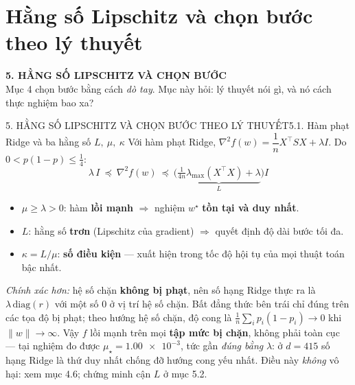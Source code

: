 \documentclass[aspectratio=169,11pt]{beamer}
\newcommand{\wstar}{w^{\star}}
\newcommand{\norm}[1]{\lVert #1 \rVert}
\begin{document}
\section{Hằng số Lipschitz và chọn bước theo lý thuyết}

\begin{frame}[plain]
  \label{sec:5}%
  \begin{center}{\Large\color{accent}\textbf{5. HẰNG SỐ LIPSCHITZ VÀ CHỌN BƯỚC}}\\[4pt]
  {\small Mục 4 chọn bước bằng cách \emph{dò tay}. Mục này hỏi: lý thuyết nói gì,
  và nó cách thực nghiệm bao xa?}\end{center}
\end{frame}

\begin{frame}{5. HẰNG SỐ LIPSCHITZ VÀ CHỌN BƯỚC THEO LÝ THUYẾT}{5.1. Hàm phạt Ridge và ba hằng số $L,\ \mu,\ \kappa$}
  \small
  Với hàm phạt Ridge, $\nabla^2 f(w)=\dfrac1n X^\top S X+\lambda I$. Do $0<p(1-p)\le\frac14$:
  \[
    \lambda\,I\ \preceq\ \nabla^2 f(w)\ \preceq\ \Big(\underbrace{\tfrac{1}{4n}\lambda_{\max}(X^\top X)+\lambda}_{L}\Big) I
  \]
  \begin{itemize}
    \item $\mu\ge\lambda>0$: hàm \textbf{lồi mạnh} $\Rightarrow$ nghiệm $\wstar$ \textbf{tồn tại và duy nhất}.
    \item $L$: hằng số \textbf{trơn} (Lipschitz của gradient) $\Rightarrow$ quyết định độ dài bước tối đa.
    \item $\kappa=L/\mu$: \textbf{số điều kiện} — xuất hiện trong tốc độ hội tụ của mọi thuật toán bậc nhất.
  \end{itemize}
  \vspace{2pt}
  {\footnotesize\textit{Chính xác hơn:} hệ số chặn \textbf{không bị phạt}, nên số hạng Ridge thực ra là
  $\lambda\,\mathrm{diag}(r)$ với một số $0$ ở vị trí hệ số chặn. Bất đẳng thức bên trái chỉ đúng trên các
  tọa độ bị phạt; theo hướng hệ số chặn, độ cong là $\frac1n\sum_i p_i(1-p_i)\to0$ khi $\norm{w}\to\infty$.
  Vậy $f$ lồi mạnh trên mọi \textbf{tập mức bị chặn}, không phải toàn cục --- tại nghiệm đo được
  $\mu_\star=\num{1.00e-3}$, tức gần \emph{đúng bằng} $\lambda$: ở $d=415$ số hạng Ridge là thứ duy
  nhất chống đỡ hướng cong yếu nhất. Điều này \emph{không} vô hại: xem mục 4.6; chứng minh cận $L$ ở mục 5.2.}
\end{frame}
\end{document}

